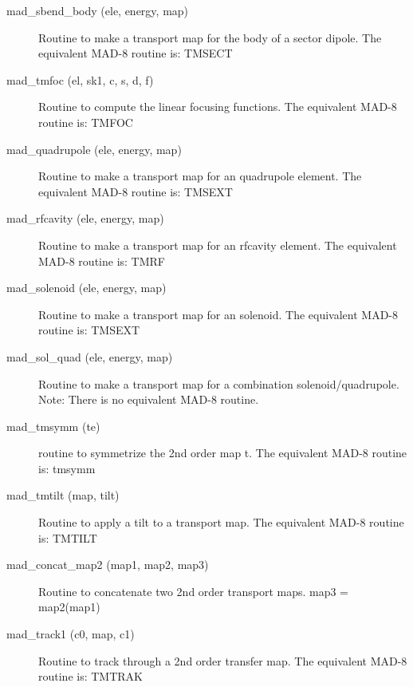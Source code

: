 \begin{description}
\label{r:mad.sbend.body}
\item[mad_sbend_body (ele, energy, map)] \Newline 
     Routine to make a transport map for the body of a sector dipole.
     The equivalent MAD-8 routine is: TMSECT

\label{r:mad.tmfoc}
\item[mad_tmfoc (el, sk1, c, s, d, f)] \Newline 
     Routine to compute the linear focusing functions.  
     The equivalent MAD-8 routine is: TMFOC

\label{r:mad.quadrupole}
\item[mad_quadrupole (ele, energy, map)] \Newline 
     Routine to make a transport map for an quadrupole element.
     The equivalent MAD-8 routine is: TMSEXT

\label{r:mad.rfcavity}
\item[mad_rfcavity (ele, energy, map)] \Newline 
     Routine to make a transport map for an rfcavity element.
     The equivalent MAD-8 routine is: TMRF

\label{r:mad.solenoid}
\item[mad_solenoid (ele, energy, map)] \Newline 
     Routine to make a transport map for an solenoid.
     The equivalent MAD-8 routine is: TMSEXT

\label{r:mad.sol.quad}
\item[mad_sol_quad (ele, energy, map)] \Newline 
     Routine to make a transport map for a combination solenoid/quadrupole.
     Note: There is no equivalent MAD-8 routine.

\label{r:mad.tmsymm}
\item[mad_tmsymm (te)] \Newline 
     routine to symmetrize the 2nd order map t.
     The equivalent MAD-8 routine is: tmsymm

\label{r:mad.tmtilt}
\item[mad_tmtilt (map, tilt)] \Newline 
     Routine to apply a tilt to a transport map.
     The equivalent MAD-8 routine is: TMTILT

\label{r:mad.concat.map2}
\item[mad_concat_map2 (map1, map2, map3)] \Newline 
     Routine to concatenate two 2nd order transport maps.
         map3 = map2(map1)

\label{r:mad.track1}
\item[mad_track1 (c0, map, c1)] \Newline 
     Routine to track through a 2nd order transfer map.
     The equivalent MAD-8 routine is: TMTRAK


\end{description}
